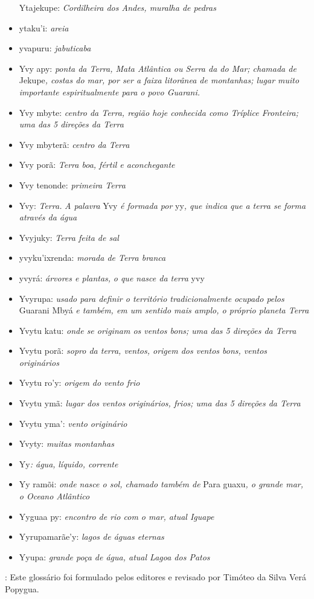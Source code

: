 \begin{itemize}
  Ytajekupe: \emph{Cordilheira dos Andes, muralha de pedras}
\item
  ytaku'i: \emph{areia}
\item
  yvapuru: \emph{jabuticaba}
\item
  Yvy apy: \emph{ponta da Terra, Mata Atlântica ou Serra da do Mar;
  chamada de} Jekupe\emph{, costas do mar, por ser a faixa litorânea de
  montanhas; lugar muito importante espiritualmente para o povo
  Guarani.} 
\item
  Yvy mbyte: \emph{centro da Terra, região hoje conhecida como Tríplice
  Fronteira; uma das 5 direções da Terra}
\item
  Yvy mbyterã: \emph{centro da Terra}
\item
  Yvy porã: \emph{Terra boa, fértil e aconchegante}
\item
  Yvy tenonde: \emph{primeira Terra}
\item
  Yvy: \emph{Terra.} \emph{A palavra} Yvy \emph{é formada por} yy\emph{,
  que indica que a terra se forma através da água}
\item
  Yvyjuky: \emph{Terra feita de sal}
\item
  yvyku'ixrenda: \emph{morada de Terra branca}
\item
  yvyrá: \emph{árvores e plantas,} \emph{o que nasce da terra} yvy
\item
  Yvyrupa: \emph{usado para definir o território tradicionalmente
  ocupado pelos} Guarani Mbyá \emph{e também, em um sentido mais amplo,
  o próprio planeta Terra}
\item
  Yvytu katu: \emph{onde se originam os ventos bons; uma das 5 direções
  da Terra}
\item
  Yvytu porã: \emph{sopro da terra, ventos, origem dos ventos bons,
  ventos originários}
\item
  Yvytu ro'y: \emph{origem do vento frio}
\item
  Yvytu ymã: \emph{lugar dos ventos originários, frios; uma das 5
  direções da Terra}
\item
  Yvytu yma': \emph{vento originário}
\item
  Yvyty: \emph{muitas montanhas}
\item
  Yy\emph{: água,} \emph{líquido, corrente}
\item
  Yy ramõi: \emph{onde nasce o sol, chamado também de} Para guaxu\emph{,
  o grande mar, o Oceano Atlântico}
\item
  Yyguaa py: \emph{encontro de rio com o mar, atual Iguape}
\item
  Yyrupamarãe'y: \emph{lagos de águas eternas}
\item
  Yyupa: \emph{grande poça de água, atual Lagoa dos Patos}
\end{itemize}

\emph{​}: Este glossário foi formulado pelos editores e revisado por
Timóteo da Silva Verá Popygua.
